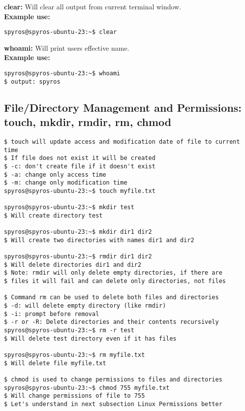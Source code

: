 \documentclass{article}
\begin{document}
\textbf{clear:} Will clear all output from current terminal window.\\\newline
\textbf{Example use:}
\begin{lstlisting}
spyros@spyros-ubuntu-23:~$ clear

\end{lstlisting}
\textbf{whoami:} Will print users effective name.\\\newline
\textbf{Example use:}
\begin{lstlisting}
spyros@spyros-ubuntu-23:~$ whoami
$ output: spyros
\end{lstlisting}

\subsection{File/Directory Management and Permissions:\\touch, mkdir, rmdir, rm, chmod}
\begin{lstlisting}
$ touch will update access and modification date of file to current time
$ If file does not exist it will be created
$ -c: don't create file if it doesn't exist
$ -a: change only access time
$ -m: change only modification time
spyros@spyros-ubuntu-23:~$ touch myfile.txt

spyros@spyros-ubuntu-23:~$ mkdir test
$ Will create directory test

spyros@spyros-ubuntu-23:~$ mkdir dir1 dir2
$ Will create two directories with names dir1 and dir2

spyros@spyros-ubuntu-23:~$ rmdir dir1 dir2
$ Will delete directories dir1 and dir2
$ Note: rmdir will only delete empty directories, if there are
$ files it will fail and can delete only directories, not files

$ Command rm can be used to delete both files and directories
$ -d: will delete empty directory (like rmdir)
$ -i: prompt before removal
$ -r or -R: Delete directories and their contents recursively
spyros@spyros-ubuntu-23:~$ rm -r test
$ Will delete test directory even if it has files

spyros@spyros-ubuntu-23:~$ rm myfile.txt
$ Will delete file myfile.txt

$ chmod is used to change permissions to files and directories
spyros@spyros-ubuntu-23:~$ chmod 755 myfile.txt
$ Will change permissions of file to 755
$ Let's understand in next subsection Linux Permissions better
\end{lstlisting}
\end{document}
